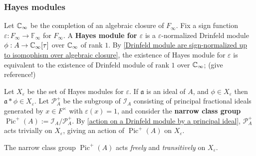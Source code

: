 \documentclass{article}
\newcommand{\F}{\mathbb{F}}
\DeclareMathOperator{\pic}{Pic}
\begin{document}

\subsubsection{Hayes modules}

Let $\mathbb{C}_\infty$ be the completion of an algebraic closure of $F_\infty$.
Fix a sign function $\varepsilon : F_\infty\to\F_\infty$ for $F_\infty$.
A \textbf{Hayes module for $\varepsilon$}
is a $\varepsilon$-normalized Drinfeld module $\phi : A\to \mathbb{C}_\infty[\tau]$ over $\mathbb{C}_\infty$ of rank $1$.
By \cref{Drinfeld module are sign-normalized up to isomophism over algebraic closure},
the existence of Hayes module for $\varepsilon$ is equivalent to the existence of Drinfeld module of rank $1$ over $\mathbb{C}_\infty$;
(give reference!)

Let $X_\varepsilon$ be the set of Hayes modules for $\varepsilon$.
If $\mathfrak{a}$ is an ideal of $A$, and $\phi\in X_\varepsilon$
then $\mathfrak{a}*\phi\in X_\varepsilon$.
Let $\mathcal{P}^+_A$ be the subgroup of $\mathcal{I}_A$ consisting of principal fractional ideals generated by $x\in F^\times$ with $\varepsilon(x) = 1$, and consider the \textbf{narrow class group} $\pic^+(A) := \mathcal{I}_A/\mathcal{P}^+_A$.
By \cref{action on a Drinfeld module by a principal ideal},
$\mathcal{P}_A^+$ acts trivially on $X_\varepsilon$,
giving an action of $\pic^+(A)$ on $X_\varepsilon$.

\begin{proposition}\label{action of Pic+ on the set of Hayes modules}
    The narrow class group $\pic^+(A)$ acts \textit{freely} and \textit{transitively} on $X_\varepsilon$.
\end{proposition}
\end{document}

